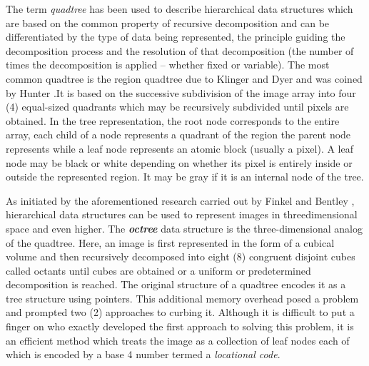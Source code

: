 \hspace{30} The   term   \textit{quadtree}   has   been   used   to   describe   hierarchical   data  
structures   which   are   based   on   the   common   property   of   recursive  
decomposition   and   can   be   differentiated   by   the   type   of   data   being   represented,  
the   principle   guiding   the   decomposition   process   and   the   resolution   of   that  
decomposition   (the   number   of   times   the   decomposition   is   applied   –   whether  
fixed   or   variable).   The   most   common   quadtree   is   the   region   quadtree   due   to  
Klinger   and   Dyer \cite{24}   and   was   coined   by   Hunter \cite{25}.It   is   based   on   the  
successive   subdivision   of   the   image   array   into   four   (4)   equal-­sized   quadrants  
which   may   be   recursively   subdivided   until   pixels   are   obtained.   In   the   tree  
representation,   the   root   node   corresponds   to   the   entire   array,   each   child   of   a  
node   represents   a   quadrant   of   the   region   the   parent   node   represents   while   a  
leaf   node   represents   an   atomic   block   (usually   a   pixel).   A   leaf   node   may   be  
black   or   white   depending   on   whether   its   pixel   is   entirely   inside   or   outside   the  
represented region. It may be gray if it is an internal node of the tree.  

\hspace{30} As   initiated   by   the   aforementioned   research   carried   out   by   Finkel   and  
Bentley \cite{26},   hierarchical   data   structures   can   be   used   to   represent   images   in  
three­dimensional   space   and   even   higher.   The   \textit{\textbf{octree}}   data   structure   is   the  
three­-dimensional   analog   of   the   quadtree.   Here,   an   image   is   first   represented   in  
the   form   of   a   cubical   volume   and   then   recursively   decomposed   into   eight   (8)  
congruent   disjoint   cubes   called   octants   until   cubes   are   obtained   or   a   uniform   or  
predetermined   decomposition   is   reached.   The   original   structure   of   a   quadtree  
encodes   it   as   a   tree   structure   using   pointers.   This   additional   memory   overhead  
posed   a   problem   and   prompted   two   (2)   approaches   to   curbing   it.   Although   it   is  
difficult   to   put   a   finger   on   who   exactly   developed   the   first   approach   to   solving  
this   problem,   it   is   an   efficient   method   which   treats   the   image   as   a   collection   of  
leaf   nodes   each   of   which   is   encoded   by   a   base   4   number   termed   a   \textit{locational  
code}. 

